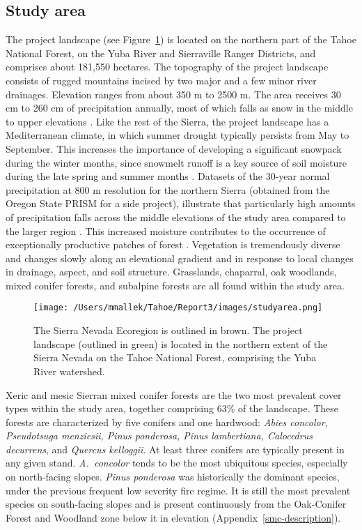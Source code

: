 \subsection*{Study area}
The project landscape (see Figure~\ref{projectarea-ch3}) is located on the northern part of the Tahoe National Forest, on the Yuba River and Sierraville Ranger Districts, and comprises about 181,550 hectares. The topography of the project landscape consists of rugged mountains incised by two major and a few minor river drainages. Elevation ranges from about 350 m to 2500 m. The area receives 30 cm to 260 cm of precipitation annually, most of which falls as snow in the middle to upper elevations \citep{Storer1963}. Like the rest of the Sierra, the project landscape has a Mediterranean climate, in which summer drought typically persists from May to September. This increases the importance of developing a significant snowpack during the winter months, since snowmelt runoff is a key source of soil moisture during the late spring and summer months \citep{Minnich2007,Skinner1996}. Datasets of the 30-year normal precipitation at 800 m resolution for the northern Sierra (obtained from the Oregon State PRISM for a side project), illustrate that particularly high amounts of precipitation falls across the middle elevations of the study area compared to the larger region \citep{PRISMClimateGroup2004}. This increased moisture contributes to the occurrence of exceptionally productive patches of forest \citep{Littell2012}. Vegetation is tremendously diverse and changes slowly along an elevational gradient and in response to local changes in drainage, aspect, and soil structure. Grasslands, chaparral, oak woodlands, mixed conifer forests, and subalpine forests are all found within the study area.

\begin{figure}
\centering
\texttt{[image: /Users/mmallek/Tahoe/Report3/images/studyarea.png]}
\caption{The Sierra Nevada Ecoregion is outlined in brown. The project landscape (outlined in green) is located in the northern extent of the Sierra Nevada on the Tahoe National Forest, comprising the Yuba River watershed.}
\label{projectarea-ch3}
\end{figure}

Xeric and mesic Sierran mixed conifer forests are the two most prevalent cover types within the study area, together comprising 63\% of the landscape. These forests are characterized by five conifers and one hardwood: \emph{Abies concolor, Pseudotsuga menziesii, Pinus ponderosa, Pinus lambertiana, Calocedrus decurrens}, and \emph{Quercus kelloggii}. At least three conifers are typically present in any given stand. \emph{A.~concolor} tends to be the most ubiquitous species, especially on north-facing slopes. \emph{Pinus ponderosa} was historically the dominant species, under the previous frequent low severity fire regime. It is still the most prevalent species on south-facing slopes and is present continuously from the Oak-Conifer Forest and Woodland zone below it in elevation (Appendix~\ref{smc-description}).


